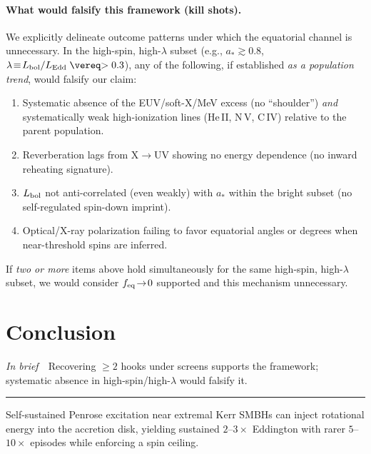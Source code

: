 \documentclass[twocolumn]{aastex701}
\DeclareRobustCommand{\tldr}[1]{%
  \noindent\textit{In brief}\ \textemdash\ #1%
  \par\smallskip
  \noindent\rule{\columnwidth}{0.2pt}\par\medskip
}
\begin{document}

\paragraph{What would falsify this framework (kill shots).}
We explicitly delineate outcome patterns under which the equatorial channel is unnecessary. In the high-spin, high-$\lambda$ subset (e.g., $a_*\gtrsim0.8$, $\lambda\!\equiv\!L_{\rm bol}/L_{\rm Edd}\gtrsim0.3$), any of the following, if established \emph{as a population trend}, would falsify our claim:
\begin{enumerate}
\item Systematic absence of the EUV/soft-X/MeV excess (no ``shoulder'') \emph{and} systematically weak high-ionization lines (He\,II, N\,V, C\,IV) relative to the parent population.
\item Reverberation lags from X$\rightarrow$UV showing no energy dependence (no inward reheating signature).
\item $L_{\rm bol}$ not anti-correlated (even weakly) with $a_*$ within the bright subset (no self-regulated spin-down imprint).
\item Optical/X-ray polarization failing to favor equatorial angles or degrees when near-threshold spins are inferred.
\end{enumerate}
If \emph{two or more} items above hold simultaneously for the same high-spin, high-$\lambda$ subset, we would consider $f_{\rm eq}\!\to\!0$ supported and this mechanism unnecessary.

\section{Conclusion}\label{sec:conclusion}
\tldr{Recovering $\ge2$ hooks under screens supports the framework; systematic absence in high-spin/high-$\lambda$ would falsify it.}
Self-sustained Penrose excitation near extremal Kerr SMBHs can inject rotational energy into the accretion disk, yielding sustained $2$--$3\times$ Eddington with rarer $5$--$10\times$ episodes while enforcing a spin ceiling.

\clearpage
\appendix
\end{document}
